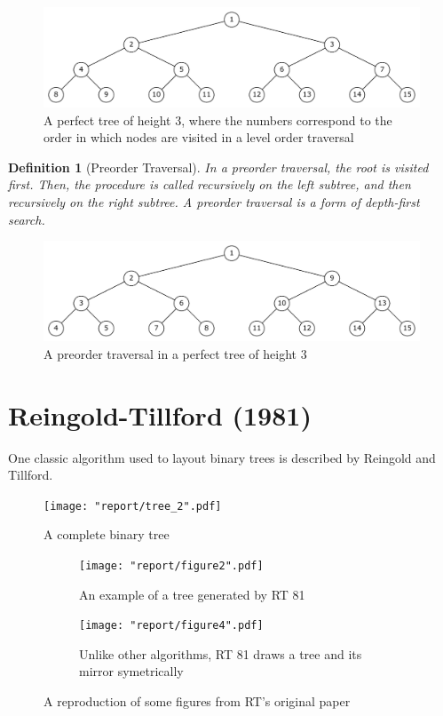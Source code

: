 \documentclass[11pt]{report}
\newtheorem{defn}{Definition}[section]
\begin{document}
\begin{figure}[H]
    \includegraphics[width=\linewidth]{report/level_order.pdf}
    \caption{A perfect tree of height 3, where the numbers correspond to the order in which nodes are visited in a level order traversal}
\end{figure}

\begin{defn}[Preorder Traversal]
    In a preorder traversal, the root is visited first. Then, the procedure is called recursively on the left subtree, and then recursively on the right subtree. A preorder traversal is a form of depth-first search.
\end{defn}

\begin{figure}[H]
    \includegraphics[width=\linewidth]{report/preorder.pdf}
    \caption{A preorder traversal in a perfect tree of height 3}
\end{figure}

\iffalse
\section{Reingold-Tillford (1981)}
One classic algorithm used to layout binary trees is described by Reingold and Tillford. 

\begin{figure}[H]
    \texttt{[image: "report/tree\_2".pdf]}
    \caption{A complete binary tree}
\end{figure}

\begin{figure}[H]
    \centering
    \begin{subfigure}{.5\textwidth}
        \centering
        \texttt{[image: "report/figure2".pdf]}
        \caption{An example of a tree generated by RT 81}
        \label{fig:fig2}
    \end{subfigure}%
    \begin{subfigure}{.5\textwidth}
        \centering
        \texttt{[image: "report/figure4".pdf]}
        \caption{Unlike other algorithms, RT 81 draws a tree and its mirror symetrically}
    \end{subfigure}%
    
    \caption{A reproduction of some figures from RT's original paper}
\end{figure}
\end{document}
